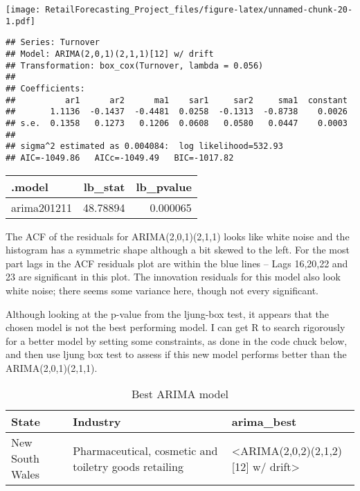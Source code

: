\documentclass[
]{article}
\begin{document}
\texttt{[image: RetailForecasting\_Project\_files/figure-latex/unnamed-chunk-20-1.pdf]}

\begin{verbatim}
## Series: Turnover 
## Model: ARIMA(2,0,1)(2,1,1)[12] w/ drift 
## Transformation: box_cox(Turnover, lambda = 0.056) 
## 
## Coefficients:
##          ar1      ar2      ma1    sar1     sar2     sma1  constant
##       1.1136  -0.1437  -0.4481  0.0258  -0.1313  -0.8738    0.0026
## s.e.  0.1358   0.1273   0.1206  0.0608   0.0580   0.0447    0.0003
## 
## sigma^2 estimated as 0.004084:  log likelihood=532.93
## AIC=-1049.86   AICc=-1049.49   BIC=-1017.82
\end{verbatim}

\begin{table}
\centering
\begin{tabular}{l|r|r}
\hline
.model & lb\_stat & lb\_pvalue\\
\hline
arima201211 & 48.78894 & 0.000065\\
\hline
\end{tabular}
\end{table}

The ACF of the residuals for ARIMA(2,0,1)(2,1,1) looks like white noise
and the histogram has a symmetric shape although a bit skewed to the
left. For the most part lags in the ACF residuals plot are within the
blue lines -- Lags 16,20,22 and 23 are significant in this plot. The
innovation residuals for this model also look white noise; there seems
some variance here, though not every significant.

Although looking at the p-value from the ljung-box test, it appears that
the chosen model is not the best performing model. I can get R to search
rigorously for a better model by setting some constraints, as done in
the code chuck below, and then use ljung box test to assess if this new
model performs better than the ARIMA(2,0,1)(2,1,1).

\begin{table}

\caption{\label{tab:unnamed-chunk-22}Best ARIMA model}
\centering
\begin{tabular}[t]{l|l|l}
\hline
State & Industry & arima\_best\\
\hline
New South Wales & Pharmaceutical, cosmetic and toiletry goods retailing & <ARIMA(2,0,2)(2,1,2)[12] w/ drift>\\
\hline
\end{tabular}
\end{table}
\end{document}
